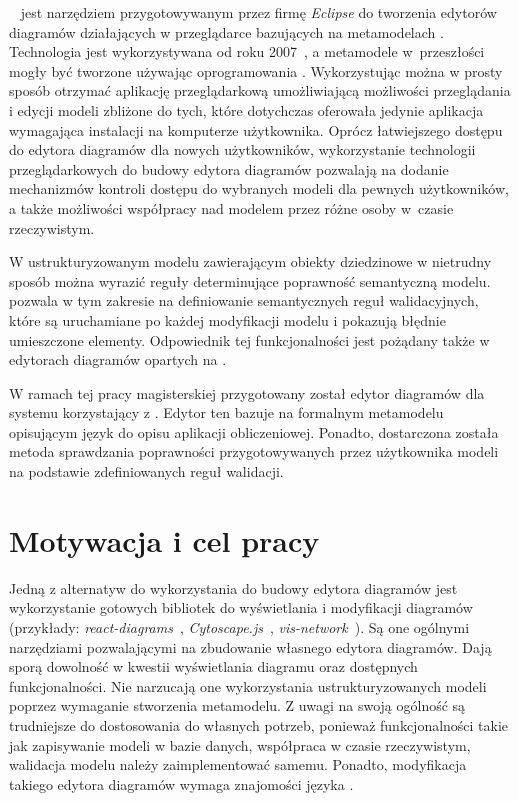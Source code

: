 \SiriusWeb{}~\cite{sirius-web-github} jest narzędziem przygotowywanym przez
firmę \emph{Eclipse} do tworzenia edytorów
diagramów działających w przeglądarce bazujących na metamodelach \EMF{}.
Technologia \EMF{} jest wykorzystywana od roku
2007~\cite{eclipse-sirius-wikipedia}, a metamodele
w~przeszłości mogły być tworzone używając oprogramowania \SiriusDesktop{}.
Wykorzystując \SiriusWeb{} można w prosty sposób otrzymać aplikację
przeglądarkową umożliwiającą możliwości przeglądania i edycji modeli zbliżone
do tych,
które dotychczas oferowała jedynie aplikacja wymagająca instalacji na
komputerze użytkownika. Oprócz łatwiejszego dostępu do edytora diagramów dla
nowych użytkowników, wykorzystanie technologii przeglądarkowych do budowy
edytora diagramów pozwalają na dodanie mechanizmów kontroli dostępu do
wybranych modeli dla pewnych użytkowników, a także możliwości współpracy nad
modelem przez różne osoby w~czasie rzeczywistym.

W ustrukturyzowanym modelu zawierającym obiekty dziedzinowe w nietrudny sposób
można wyrazić reguły determinujące poprawność semantyczną modelu.
\SiriusDesktop{} pozwala w tym zakresie na definiowanie semantycznych reguł
walidacyjnych, które są uruchamiane po każdej modyfikacji modelu i pokazują
błędnie umieszczone elementy. Odpowiednik tej funkcjonalności jest pożądany
także w edytorach diagramów opartych na \SiriusWeb{}.

W ramach tej pracy magisterskiej przygotowany został edytor diagramów dla
systemu \BalticLSC{} korzystający z \SiriusWeb{}. Edytor ten bazuje na
formalnym metamodelu \EMF{} opisującym język \CAL{} do
opisu aplikacji obliczeniowej. Ponadto, dostarczona została metoda sprawdzania
poprawności przygotowywanych przez użytkownika modeli na podstawie
zdefiniowanych reguł walidacji.

\section{Motywacja i cel pracy}

Jedną z alternatyw do wykorzystania \SiriusWeb{} do budowy edytora diagramów
jest
wykorzystanie gotowych bibliotek \JavaScript{} do wyświetlania i modyfikacji
diagramów (przykłady: \emph{react-diagrams}~\cite{react-diagrams-github},
\emph{Cytoscape.js}~\cite{cytoscape-js-homepage},
\emph{vis-network}~\cite{vis-network-github}). Są one ogólnymi narzędziami
pozwalającymi na zbudowanie własnego edytora diagramów. Dają sporą dowolność w
kwestii wyświetlania diagramu oraz
dostępnych funkcjonalności. Nie narzucają one
wykorzystania ustrukturyzowanych modeli poprzez wymaganie stworzenia
metamodelu. Z uwagi na swoją ogólność są trudniejsze do dostosowania do
własnych potrzeb, ponieważ funkcjonalności takie jak zapisywanie modeli w bazie
danych, współpraca w czasie rzeczywistym, walidacja modelu należy
zaimplementować samemu. Ponadto, modyfikacja takiego edytora diagramów wymaga
znajomości języka \JavaScript{}.

